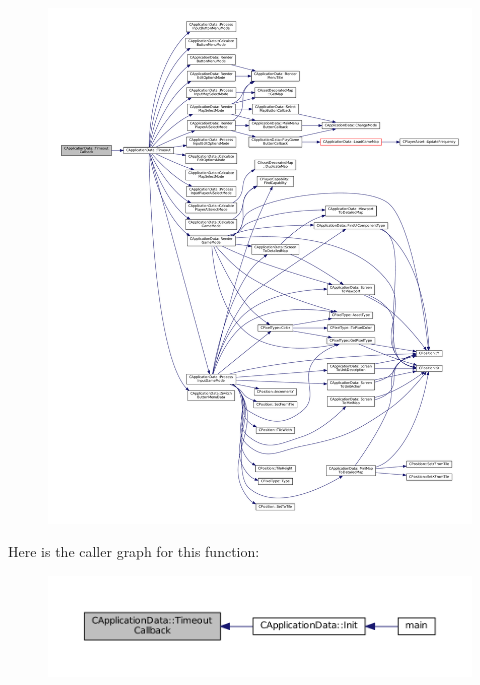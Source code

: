 \begin{figure}[H]
\begin{center}
\leavevmode
\includegraphics[width=350pt]{classCApplicationData_af66e15f6935f053b46a11aaa51a869c9_cgraph}
\end{center}
\end{figure}
Here is the caller graph for this function\+:\nopagebreak
\begin{figure}[H]
\begin{center}
\leavevmode
\includegraphics[width=350pt]{classCApplicationData_af66e15f6935f053b46a11aaa51a869c9_icgraph}
\end{center}
\end{figure}
\hypertarget{classCApplicationData_aad04c7da1cc86bef623efda1019907fd}{}\label{classCApplicationData_aad04c7da1cc86bef623efda1019907fd} 
